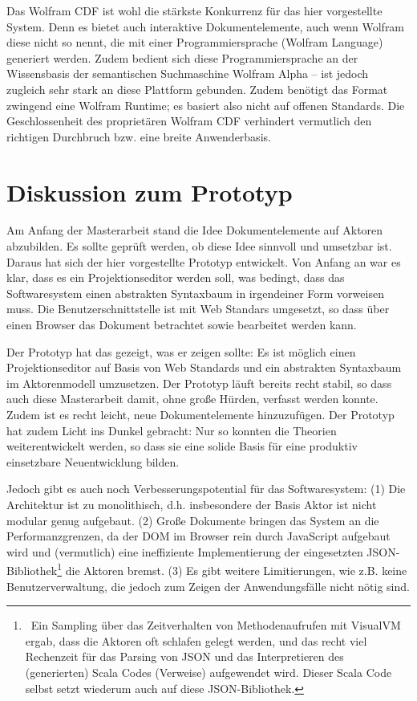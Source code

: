 
Das Wolfram CDF ist wohl die stärkste Konkurrenz für das hier vorgestellte System. Denn es bietet auch interaktive Dokumentelemente, auch wenn Wolfram diese nicht so nennt, die mit einer Programmiersprache (Wolfram Language) generiert werden. Zudem bedient sich diese Programmiersprache an der Wissensbasis der semantischen Suchmaschine Wolfram Alpha -- ist jedoch zugleich sehr stark an diese Plattform gebunden. Zudem benötigt das Format zwingend eine Wolfram Runtime; es basiert also nicht auf offenen Standards. Die Geschlossenheit des proprietären Wolfram CDF verhindert vermutlich den richtigen Durchbruch bzw. eine breite Anwenderbasis.

 
\section{Diskussion zum Prototyp}\label{}
 
Am Anfang der Masterarbeit stand die Idee Dokumentelemente auf Aktoren abzubilden. Es sollte geprüft werden, ob diese Idee sinnvoll und umsetzbar ist. Daraus hat sich der hier vorgestellte Prototyp entwickelt. Von Anfang an war es klar, dass es ein Projektionseditor werden soll, was bedingt, dass das Softwaresystem einen abstrakten Syntaxbaum in irgendeiner Form vorweisen muss. Die Benutzerschnittstelle ist mit Web Standars umgesetzt, so dass über einen Browser das Dokument betrachtet sowie bearbeitet werden kann.

 
Der Prototyp hat das gezeigt, was er zeigen sollte: Es ist möglich einen Projektionseditor auf Basis von Web Standards und ein abstrakten Syntaxbaum im Aktorenmodell umzusetzen. Der Prototyp läuft bereits recht stabil, so dass auch diese Masterarbeit damit, ohne große Hürden, verfasst werden konnte. Zudem ist es recht leicht, neue Dokumentelemente hinzuzufügen. Der Prototyp hat zudem Licht ins Dunkel gebracht: Nur so konnten die Theorien weiterentwickelt werden, so dass sie eine solide Basis für eine produktiv einsetzbare Neuentwicklung bilden.

 
Jedoch gibt es auch noch Verbesserungspotential für das Softwaresystem: (1) Die Architektur ist zu monolithisch, d.h. insbesondere der Basis Aktor ist nicht modular genug aufgebaut. (2) Große Dokumente bringen das System an die Performanzgrenzen, da der DOM im Browser rein durch JavaScript aufgebaut wird und (vermutlich) eine ineffiziente Implementierung der eingesetzten JSON-Bibliothek\footnote{~Ein Sampling über das Zeitverhalten von Methodenaufrufen mit VisualVM ergab, dass die Aktoren oft schlafen gelegt werden, und das recht viel Rechenzeit für das Parsing von JSON und das Interpretieren des (generierten) Scala Codes (Verweise) aufgewendet wird. Dieser Scala Code selbst setzt wiederum auch auf diese JSON-Bibliothek.} die Aktoren bremst. (3) Es gibt weitere Limitierungen, wie z.B. keine Benutzerverwaltung, die jedoch zum Zeigen der Anwendungsfälle nicht nötig sind.

